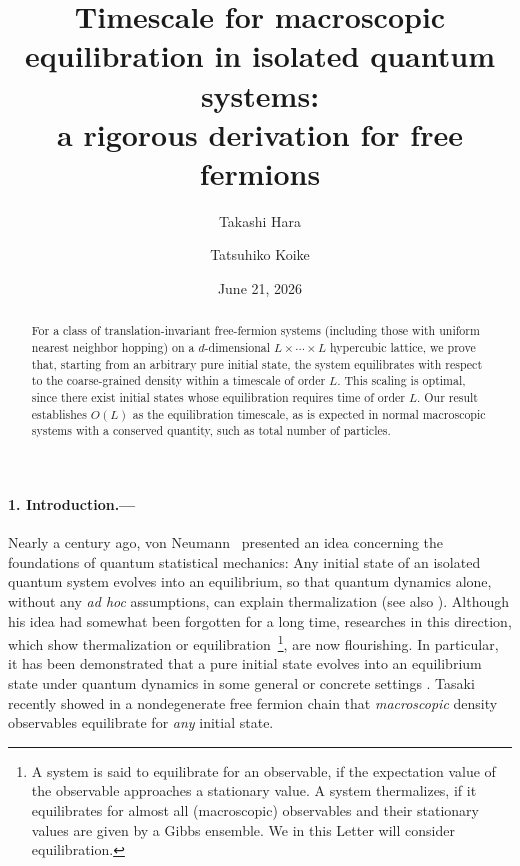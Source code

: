 \documentclass[aps,prl,superscriptaddress,reprint]{revtex4-2}
\newcommand{\Date}{June 21, 2026}
\newcommand{\se}[1]{\paragraph{#1.---}}
\theoremstyle{definition}
\newcommand{\timescale}{timescale}
\begin{document}
\title{
      	Timescale for macroscopic equilibration in isolated quantum systems:
        \\
        a rigorous derivation for free fermions
}
\author{Takashi Hara}
\author{Tatsuhiko Koike}
\date{\Date}


\begin{abstract}
  For a
  class of translation-invariant free-fermion systems
(including those with uniform nearest neighbor hopping)
on a $d$-dimensional $L \times \cdots \times L$ hypercubic lattice,
we prove that, starting from an arbitrary pure initial state,
the system equilibrates with respect to
the coarse-grained density within a {\timescale} of order $L$.
This scaling is optimal,
since there exist initial states whose equilibration requires time of order $L$.
Our result establishes $O(L)$ as the equilibration {\timescale},
as is expected in normal macroscopic systems with a conserved quantity,
such as total number of particles.
\end{abstract}
\maketitle
\thispagestyle{empty}




\se{1. Introduction}

Nearly a century ago,
von Neumann~\cite{neumann1929beweis,*von2010proof}
presented an idea concerning
the foundations of quantum statistical mechanics:
Any initial state of an isolated quantum system
evolves into an equilibrium, so that  quantum dynamics alone,
without  any
\emph{ad hoc} assumptions, can explain thermalization
(see also \cite{GLTZ-2010,Reimann2015-PhysRevLett.115.010403}).
Although his idea had somewhat been forgotten
for a long time,
researches in this direction,
which show thermalization or equilibration~\footnote{
A system is said to equilibrate for an observable, if the expectation
value of the observable approaches
a stationary value.  A system thermalizes, if it equilibrates for
almost all (macroscopic) observables and
their stationary values are given by a Gibbs ensemble.
We in this Letter will consider equilibration.
},
are now flourishing.
In particular, it has been demonstrated
that a pure initial state evolves into an equilibrium
state under quantum dynamics in some general or concrete settings
\cite{Tasaki1998-PhysRevLett.80.1373,Rigol2008Nature,Reimann2008-PhysRevLett.101.190403,Goldstein-Lebowitz-2010-PhysRevE.81.011109,Reimann_2012isol,ShiraishiTasaki2024JSP,RoosSTT2024}.
Tasaki~\cite{Tasaki2024freeexpansion}
recently showed in  a nondegenerate free fermion chain
that
\emph{macroscopic} density observables
equilibrate for \emph{any} initial state.
\end{document}
